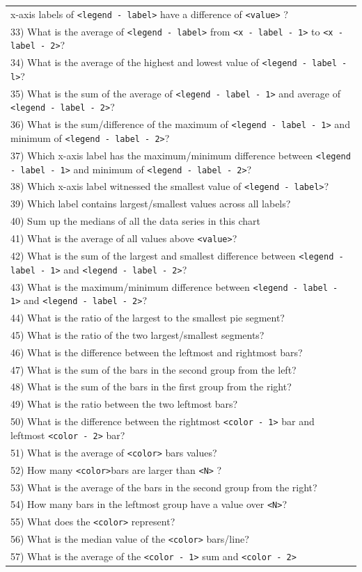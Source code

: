 \begin{table}[t]
{\begin{tabular}{|l|}
x-axis labels of \texttt{<legend - label>} have a difference of \texttt{<value>} ? \\33) What is the average of  \texttt{<legend - label>} from \texttt{<x - label - 1>} to \texttt{<x - label - 2>}? \\34) What is the average of the highest and lowest value of \texttt{<legend - label - l>}? \\35) What is the sum of the average of \texttt{<legend - label - 1>} and average of \texttt{<legend - label - 2>}? \\36) What is the sum/difference of the maximum of \texttt{<legend - label - 1>} and minimum of \texttt{<legend - label - 2>}? \\37) Which x-axis label has the maximum/minimum difference between \texttt{<legend - label - 1>} and minimum of \texttt{<legend - label - 2>}? \\38) Which x-axis label witnessed the smallest value of \texttt{<legend - label>}? \\39) Which label contains largest/smallest values across all labels? \\40) Sum up the medians of all the data series in this chart \\41) What is the average of all values above \texttt{<value>}?  \\42) What is the sum of the largest and smallest difference between \texttt{<legend - label - 1>} and \texttt{<legend - label - 2>}? \\43) What is the maximum/minimum difference between \texttt{<legend - label - 1>} and \texttt{<legend - label - 2>}? \\44) What is the ratio of the largest to the smallest pie segment? \\45) What is the ratio of the two largest/smallest segments? \\46) What is the difference between the leftmost and rightmost bars? \\47) What is the sum of the bars in the second group from the left? \\48) What is the sum of the bars in the first group from the right? \\49) What is the ratio between the two leftmost bars? \\50) What is the difference between the rightmost \texttt{<color - 1>} bar and leftmost \texttt{<color - 2>} bar? \\51) What is the average of  \texttt{<color>} bars values? \\52) How many  \texttt{<color>}bars are larger than \texttt{<N>} ? \\53) What is the average of the bars in the second group from the right? \\54) How many bars in the leftmost group have a value over \texttt{<N>}? \\55) What does the  \texttt{<color>} represent? \\56) What is the median value of the  \texttt{<color>} bars/line? \\57) What is the average of the  \texttt{<color - 1>} sum and  \texttt{<color - 2>} 
\end{tabular}}
\end{table}
